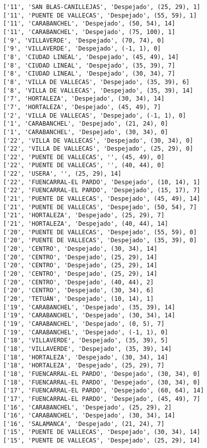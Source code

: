 \documentclass[11pt]{article}
\begin{document}
\begin{Verbatim}[commandchars=\\\{\}]
['11', 'SAN BLAS-CANILLEJAS', 'Despejado', (25, 29), 1]
['11', 'PUENTE DE VALLECAS', 'Despejado', (55, 59), 1]
['11', 'CARABANCHEL', 'Despejado', (50, 54), 14]
['11', 'CARABANCHEL', 'Despejado', (75, 100), 1]
['9', 'VILLAVERDE', 'Despejado', (70, 74), 0]
['9', 'VILLAVERDE', 'Despejado', (-1, 1), 0]
['8', 'CIUDAD LINEAL', 'Despejado', (45, 49), 14]
['8', 'CIUDAD LINEAL', 'Despejado', (35, 39), 7]
['8', 'CIUDAD LINEAL', 'Despejado', (30, 34), 7]
['8', 'VILLA DE VALLECAS', 'Despejado', (35, 39), 6]
['8', 'VILLA DE VALLECAS', 'Despejado', (35, 39), 14]
['7', 'HORTALEZA', 'Despejado', (30, 34), 14]
['7', 'HORTALEZA', 'Despejado', (45, 49), 7]
['2', 'VILLA DE VALLECAS', 'Despejado', (-1, 1), 0]
['1', 'CARABANCHEL', 'Despejado', (21, 24), 0]
['1', 'CARABANCHEL', 'Despejado', (30, 34), 0]
['22', 'VILLA DE VALLECAS', 'Despejado', (30, 34), 0]
['22', 'VILLA DE VALLECAS', 'Despejado', (25, 29), 0]
['22', 'PUENTE DE VALLECAS', '', (45, 49), 0]
['22', 'PUENTE DE VALLECAS', '', (40, 44), 0]
['22', 'USERA', '', (25, 29), 14]
['22', 'FUENCARRAL-EL PARDO', 'Despejado', (10, 14), 1]
['22', 'FUENCARRAL-EL PARDO', 'Despejado', (15, 17), 7]
['21', 'PUENTE DE VALLECAS', 'Despejado', (45, 49), 14]
['21', 'PUENTE DE VALLECAS', 'Despejado', (50, 54), 7]
['21', 'HORTALEZA', 'Despejado', (25, 29), 7]
['21', 'HORTALEZA', 'Despejado', (40, 44), 14]
['20', 'PUENTE DE VALLECAS', 'Despejado', (55, 59), 0]
['20', 'PUENTE DE VALLECAS', 'Despejado', (35, 39), 0]
['20', 'CENTRO', 'Despejado', (30, 34), 14]
['20', 'CENTRO', 'Despejado', (25, 29), 14]
['20', 'CENTRO', 'Despejado', (25, 29), 14]
['20', 'CENTRO', 'Despejado', (25, 29), 14]
['20', 'CENTRO', 'Despejado', (40, 44), 2]
['20', 'CENTRO', 'Despejado', (30, 34), 6]
['20', 'TETUÁN', 'Despejado', (10, 14), 1]
['19', 'CARABANCHEL', 'Despejado', (35, 39), 14]
['19', 'CARABANCHEL', 'Despejado', (30, 34), 14]
['19', 'CARABANCHEL', 'Despejado', (0, 5), 7]
['19', 'CARABANCHEL', 'Despejado', (-1, 1), 0]
['18', 'VILLAVERDE', 'Despejado', (35, 39), 5]
['18', 'VILLAVERDE', 'Despejado', (35, 39), 14]
['18', 'HORTALEZA', 'Despejado', (30, 34), 14]
['18', 'HORTALEZA', 'Despejado', (25, 29), 7]
['18', 'FUENCARRAL-EL PARDO', 'Despejado', (30, 34), 0]
['18', 'FUENCARRAL-EL PARDO', 'Despejado', (30, 34), 0]
['17', 'FUENCARRAL-EL PARDO', 'Despejado', (60, 64), 14]
['17', 'FUENCARRAL-EL PARDO', 'Despejado', (45, 49), 7]
['16', 'CARABANCHEL', 'Despejado', (25, 29), 2]
['16', 'CARABANCHEL', 'Despejado', (30, 34), 14]
['16', 'SALAMANCA', 'Despejado', (21, 24), 7]
['15', 'PUENTE DE VALLECAS', 'Despejado', (30, 34), 14]
['15', 'PUENTE DE VALLECAS', 'Despejado', (25, 29), 14]

\end{Verbatim}
\end{document}
